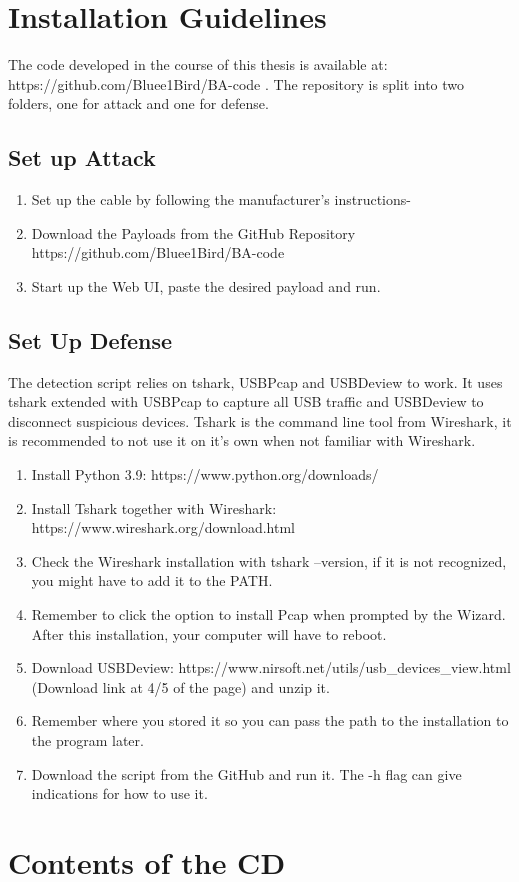 \appendix

\chapter{Installation Guidelines}

The code developed in the course of this thesis is available at: https://github.com/Bluee1Bird/BA-code .
The repository is split into two folders, one for attack and one for defense.

    
\section{Set up Attack}  

\begin{enumerate}
    \item Set up the cable by following the manufacturer's instructions-
    \item Download the Payloads from the GitHub Repository https://github.com/Bluee1Bird/BA-code 
    \item Start up the Web UI, paste the desired payload and run. 
\end{enumerate}



\section{Set Up Defense}

The detection script relies on tshark, USBPcap and USBDeview to work. It uses tshark extended with USBPcap to capture all USB traffic and USBDeview to disconnect suspicious devices. Tshark is the command line tool from Wireshark, it is recommended to not use it on it's own when not familiar with Wireshark.

\begin{enumerate}
    \item Install Python 3.9: https://www.python.org/downloads/
    \item Install Tshark together with Wireshark: https://www.wireshark.org/download.html
    \item Check the Wireshark installation with tshark --version, if it is not recognized, you might have to add it to the PATH.
    \item Remember to click the option to install Pcap when prompted by the Wizard. After this installation, your computer will have to reboot.
    \item Download USBDeview: https://www.nirsoft.net/utils/usb\_devices\_view.html (Download link at 4/5 of the page) and unzip it.
    \item Remember where you stored it so you can pass the path to the installation to the program later.
    \item Download the script from the GitHub and run it. The -h flag can give indications for how to use it.
\end{enumerate}
    




\chapter{Contents of the CD}
